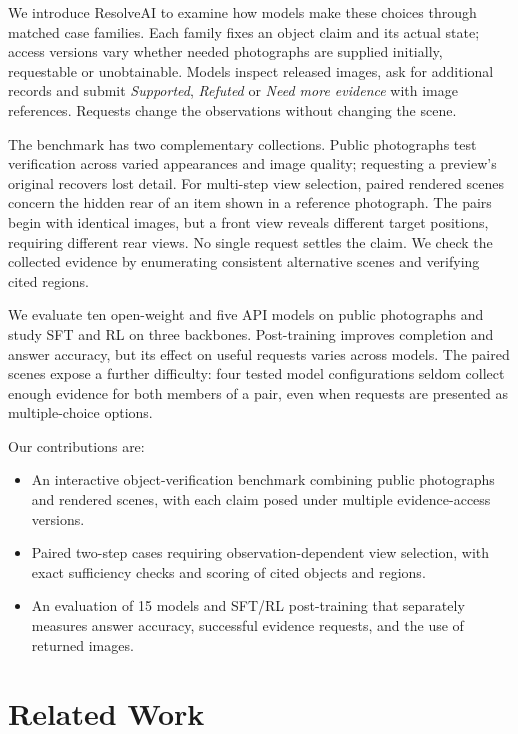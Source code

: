 \documentclass[10pt,twocolumn,letterpaper]{article}
\newcommand{\benchmark}{ResolveAI\xspace}
\begin{document}
We introduce \benchmark to examine how models make these choices through matched case families.
Each family fixes an object claim and its actual state; access versions vary whether needed photographs are supplied initially, requestable or unobtainable.
Models inspect released images, ask for additional records and submit \emph{Supported}, \emph{Refuted} or \emph{Need more evidence} with image references.
Requests change the observations without changing the scene.

The benchmark has two complementary collections. Public photographs test verification across varied appearances and image quality; requesting a preview's original recovers lost detail. For multi-step view selection, paired rendered scenes concern the hidden rear of an item shown in a reference photograph. The pairs begin with identical images, but a front view reveals different target positions, requiring different rear views. No single request settles the claim. We check the collected evidence by enumerating consistent alternative scenes and verifying cited regions.

We evaluate ten open-weight and five API models on public photographs and study SFT and RL on three backbones.
Post-training improves completion and answer accuracy, but its effect on useful requests varies across models.
The paired scenes expose a further difficulty: four tested model configurations seldom collect enough evidence for both members of a pair, even when requests are presented as multiple-choice options.

Our contributions are:
\begin{itemize}
\item An interactive object-verification benchmark combining public photographs and rendered scenes, with each claim posed under multiple evidence-access versions.
\item Paired two-step cases requiring observation-dependent view selection, with exact sufficiency checks and scoring of cited objects and regions.
\item An evaluation of 15 models and SFT/RL post-training that separately measures answer accuracy, successful evidence requests, and the use of returned images.
\end{itemize}

\section{Related Work}
\end{document}
